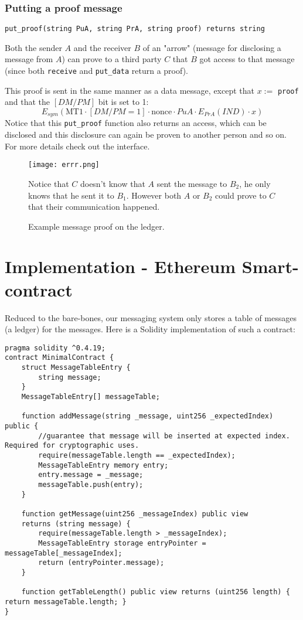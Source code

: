 \documentclass[a4paper]{article} %
\begin{document}
\subsubsection{Putting a proof message}
\lstinline{put_proof(string PuA, string PrA, string proof) returns string}

Both the sender $A$ and the receiver $B$ of an "arrow" (message for disclosing a message from $A$) can prove to a third party $C$ that $B$ got access to that message (since both \lstinline{receive} and \lstinline{put_data} return a proof).

This proof is sent in the same manner as a data message, except that 
$x :=$ \lstinline{proof} 
and that the $[DM/PM]$ bit is set to 1:
$$E_{sym}(\text{MT1} \cdot [DM/PM=1] \cdot \text{nonce} \cdot PuA \cdot E_{PrA}(IND) \cdot x)$$
Notice that this \lstinline{put_proof} function also returns an access, which can be disclosed and this disclosure can again be proven to another person and so on. For more details check out the interface.

\begin{figure}[h]
  \centering
  \texttt{[image: errr.png]}
  \caption{Example message proof on the ledger.}
  Notice that $C$ doesn't know that $A$ sent the message to $B_2$, he only knows that he sent it to $B_1$. However both $A$ or $B_2$ could prove to $C$ that their communication happened.
  \label{fig:fig1}
\end{figure}

\newpage

\section{Implementation - Ethereum Smart-contract}
Reduced to the bare-bones, our messaging system only stores a table of messages (a ledger) for the messages.
Here is a Solidity implementation of such a contract:

\begin{lstlisting}
pragma solidity ^0.4.19;
contract MinimalContract {
    struct MessageTableEntry {
        string message;
    }
    MessageTableEntry[] messageTable;

    function addMessage(string _message, uint256 _expectedIndex) public {
        //guarantee that message will be inserted at expected index. Required for cryptographic uses.
        require(messageTable.length == _expectedIndex);
        MessageTableEntry memory entry;
        entry.message = _message;
        messageTable.push(entry);
    }

    function getMessage(uint256 _messageIndex) public view
    returns (string message) {
        require(messageTable.length > _messageIndex);
        MessageTableEntry storage entryPointer = messageTable[_messageIndex];
        return (entryPointer.message);
    }
    
    function getTableLength() public view returns (uint256 length) { return messageTable.length; }
}
\end{lstlisting}
\end{document}
